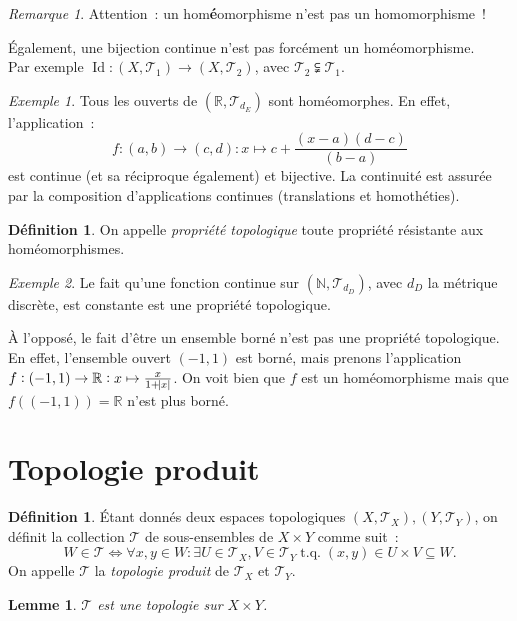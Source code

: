 \documentclass{report}
\newtheorem{lem}[thm]{Lemme}
\theoremstyle{definition}
\newtheorem{déf}[thm]{Définition}
\theoremstyle{remark}
\newtheorem*{rmq}{Remarque}
\newtheorem{ex}{Exemple}[section]
\DeclareMathOperator{\tq}{\text{ t.q. }}
\DeclareMathOperator{\Id}{Id}
\newcommand{\R}{\mathbb R}
\newcommand{\N}{\mathbb N}
\renewcommand{\top}{\mathcal T}
\begin{document}
		\begin{rmq} Attention~: un hom\textbf{é}omorphisme n'est pas un homomorphisme~!

		Également, une bijection continue n'est pas forcément un homéomorphisme.\\
		Par exemple $\Id : (X, \top_1) \to (X, \top_2)$, avec $\top_2 \subsetneqq \top_1$.
		\end{rmq}

		\begin{ex} Tous les ouverts de $(\R, \top_{d_E})$ sont homéomorphes. En effet, l'application~:
		\[f : (a, b) \to (c, d) : x \mapsto c + \frac {(x-a)(d-c)}{(b-a)}\]
		est continue (et sa réciproque également) et bijective. La continuité est assurée par la composition d'applications continues (translations et
		homothéties).
		\end{ex}

		\begin{déf} On appelle \textit{propriété topologique} toute propriété résistante aux homéomorphismes.
		\end{déf}

		\begin{ex} Le fait qu'une fonction continue sur $(\N, \top_{d_D})$, avec $d_D$ la métrique discrète, est constante est une propriété topologique.

		À l'opposé, le fait d'être un ensemble borné n'est pas une propriété topologique. En effet, l'ensemble ouvert $(-1, 1)$ est borné, mais prenons
		l'application $f : (-1, 1) \to \R : x \mapsto \frac x{1 + \abs x}$. On voit bien que $f$ est un homéomorphisme mais que $f((-1, 1)) = \R$ n'est plus borné.
		\end{ex}

	\section{Topologie produit}
		\begin{déf} Étant donnés deux espaces topologiques $(X, \top_X), (Y, \top_Y)$, on définit la collection $\top$ de sous-ensembles de $X \times Y$ comme
		suit~:
		\[W \in \top \iff \forall x, y \in W : \exists U \in \top_X, V \in \top_Y \tq (x, y) \in U \times V \subseteq W.\]
		On appelle $\top$ la \textit{topologie produit} de $\top_X$ et $\top_Y$.
		\end{déf}

		\begin{lem} $\top$ est une topologie sur $X \times Y$.
		\end{lem}
\end{document}
